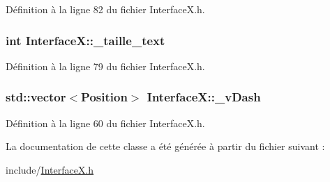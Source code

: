 Définition à la ligne 82 du fichier InterfaceX.h.

\hypertarget{a00011_a0814919e81b67a236a14ae1957081147}{
\subsubsection[{\_\-taille\_\-text}]{\setlength{\rightskip}{0pt plus 5cm}int {\bf InterfaceX::\_\-taille\_\-text}}}
\label{a00011_a0814919e81b67a236a14ae1957081147}


Définition à la ligne 79 du fichier InterfaceX.h.

\hypertarget{a00011_a20e95369c05d8a39c90baea0924d84c1}{
\subsubsection[{\_\-vDash}]{\setlength{\rightskip}{0pt plus 5cm}std::vector$<${\bf Position}$>$ {\bf InterfaceX::\_\-vDash}}}
\label{a00011_a20e95369c05d8a39c90baea0924d84c1}


Définition à la ligne 60 du fichier InterfaceX.h.



La documentation de cette classe a été générée à partir du fichier suivant :\begin{DoxyCompactItemize}
\item 
include/\hyperlink{a00028}{InterfaceX.h}\end{DoxyCompactItemize}
